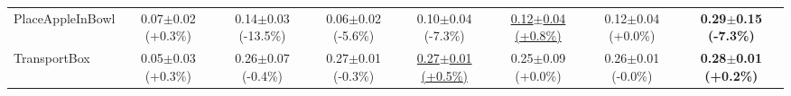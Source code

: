 \begin{table}[htbp]
\begin{adjustbox}{max width=\textwidth}
\begin{tabular}{l*{7}{c}}
PlaceAppleInBowl & 0.07$\pm$0.02 \scriptsize{(+0.3\%)} & 0.14$\pm$0.03 \scriptsize{(-13.5\%)} & 0.06$\pm$0.02 \scriptsize{(-5.6\%)} & 0.10$\pm$0.04 \scriptsize{(-7.3\%)} & \underline{0.12$\pm$0.04 \scriptsize{(+0.8\%)}} & 0.12$\pm$0.04 \scriptsize{(+0.0\%)} & \textbf{0.29$\pm$0.15 \scriptsize{(-7.3\%)}} \\
TransportBox & 0.05$\pm$0.03 \scriptsize{(+0.3\%)} & 0.26$\pm$0.07 \scriptsize{(-0.4\%)} & 0.27$\pm$0.01 \scriptsize{(-0.3\%)} & \underline{0.27$\pm$0.01 \scriptsize{(+0.5\%)}} & 0.25$\pm$0.09 \scriptsize{(+0.0\%)} & 0.26$\pm$0.01 \scriptsize{(-0.0\%)} & \textbf{0.28$\pm$0.01 \scriptsize{(+0.2\%)}} \\
\bottomrule
\end{tabular}
\end{adjustbox}
\end{table}

